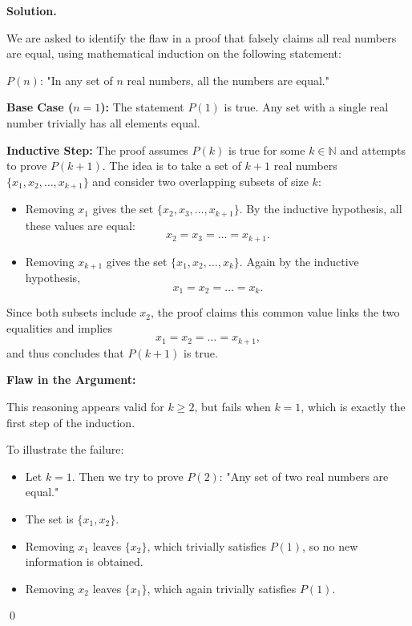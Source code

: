 \documentclass[12pt]{article}
\newenvironment{solution}{%
	\par\medskip
	\noindent\textbf{Solution.}\par\nopagebreak
}{%
	\hfill \qed \par\medskip
}
\begin{document}
\begin{solution}
	We are asked to identify the flaw in a proof that falsely claims all real numbers are equal, using mathematical induction on the following statement:
	
	\begin{center}
		$P(n)$: "In any set of $n$ real numbers, all the numbers are equal."
	\end{center}
	
	\textbf{Base Case ($n = 1$):}  
	The statement $P(1)$ is true. Any set with a single real number trivially has all elements equal.
	
	\textbf{Inductive Step:}  
	The proof assumes $P(k)$ is true for some $k \in \mathbb{N}$ and attempts to prove $P(k+1)$. The idea is to take a set of $k+1$ real numbers $\{x_1, x_2, \dots, x_{k+1}\}$ and consider two overlapping subsets of size $k$:
	
	\begin{itemize}
		\item Removing $x_1$ gives the set $\{x_2, x_3, \dots, x_{k+1}\}$. By the inductive hypothesis, all these values are equal:  
		\[
		x_2 = x_3 = \dots = x_{k+1}.
		\]
		
		\item Removing $x_{k+1}$ gives the set $\{x_1, x_2, \dots, x_k\}$. Again by the inductive hypothesis,  
		\[
		x_1 = x_2 = \dots = x_k.
		\]
	\end{itemize}
	
	Since both subsets include $x_2$, the proof claims this common value links the two equalities and implies
	\[
	x_1 = x_2 = \dots = x_{k+1},
	\]
	and thus concludes that $P(k+1)$ is true.
	
	\textbf{Flaw in the Argument:}
	
	This reasoning appears valid for \( k \geq 2 \), but fails when \( k = 1 \), which is exactly the first step of the induction.
	
	To illustrate the failure:
	
	\begin{itemize}
		\item Let \( k = 1 \). Then we try to prove \( P(2) \): "Any set of two real numbers are equal."
		\item The set is \( \{x_1, x_2\} \).
		\item Removing \( x_1 \) leaves \( \{x_2\} \), which trivially satisfies \( P(1) \), so no new information is obtained.
		\item Removing \( x_2 \) leaves \( \{x_1\} \), which again trivially satisfies \( P(1) \).
	\end{itemize}
	

\end{solution}
\end{document}

